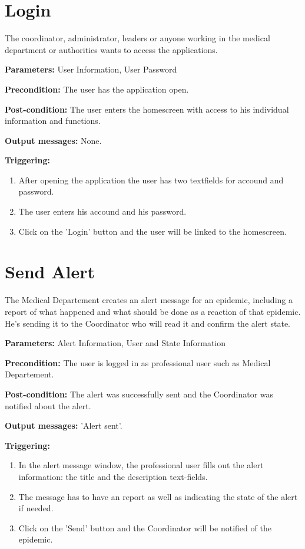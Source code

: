 \section{Login}
\label{operation:Login}
The coordinator, administrator, leaders or anyone working in the medical
department or authorities wants to access the applications.\\
\begin{description}
\item \textbf{Parameters:} User Information, User Password
\item \textbf{Precondition:} The user has the application open.
\item \textbf{Post-condition:}  The user enters the homescreen with access to
his individual information and functions.
\item \textbf{Output messages:} None.
\item \textbf{Triggering:}
\begin{enumerate}
\item After opening the application the user has two textfields for accound and
password.
\item The user enters his accound and his password.
\item Click on the 'Login' button and the user will be linked to the homescreen.
\end{enumerate}
\end{description}


\section{Send Alert}
\label{operation:SendAlert}
The Medical Departement creates an alert message for an epidemic, including a
report of what happened and what should be done as a reaction of that epidemic.
He's sending it to the Coordinator who will read it and confirm the alert
state.\\
\begin{description}
\item \textbf{Parameters:} Alert Information, User and State Information
\item \textbf{Precondition:} The user is logged in as professional user such as
Medical Departement.
\item \textbf{Post-condition:}  The alert was successfully sent and the
Coordinator was notified about the alert.
\item \textbf{Output messages:} 'Alert sent'.
\item \textbf{Triggering:}
\begin{enumerate}
\item In the alert message window, the professional user fills out the alert
information: the title and the description text-fields.
\item The message has to have an report as well as indicating the state of the
alert if needed.
\item Click on the 'Send' button and the Coordinator will be notified of the
epidemic.
\end{enumerate}
\end{description}

